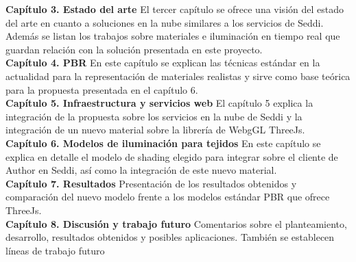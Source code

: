 \textbf{Cap\'itulo 3. Estado del arte}
El tercer cap\'itulo se ofrece una visi\'on del estado del arte en cuanto a soluciones en la nube similares a los servicios
de Seddi. Adem\'as se listan los trabajos sobre materiales e iluminaci\'on en tiempo real que guardan relaci\'on con la
soluci\'on presentada en este proyecto.\\

\textbf{Cap\'itulo 4. PBR}
En este cap\'itulo se explican las t\'ecnicas est\'andar en la actualidad para la representaci\'on de materiales realistas y
sirve como base te\'orica para la propuesta presentada en el cap\'itulo 6.\\

\textbf{Cap\'itulo 5. Infraestructura y servicios web}
El cap\'itulo 5 explica la integraci\'on de la propuesta sobre los servicios en la nube de Seddi y la integraci\'on de un nuevo material
sobre la librer\'ia de WebgGL ThreeJs.\\

\textbf{Cap\'itulo 6. Modelos de iluminaci\'on para tejidos}
En este cap\'itulo se explica en detalle el modelo de shading elegido para integrar sobre el cliente de Author en Seddi, as\'i como
la integraci\'on de este nuevo material.\\

\textbf{Cap\'itulo 7. Resultados}
Presentaci\'on de los resultados obtenidos y comparaci\'on del nuevo modelo frente a los modelos est\'andar PBR que ofrece ThreeJs.\\

\textbf{Cap\'itulo 8. Discusi\'on y trabajo futuro}
Comentarios sobre el planteamiento, desarrollo, resultados obtenidos y posibles aplicaciones. Tambi\'en se establecen
l\'ineas de trabajo futuro 
